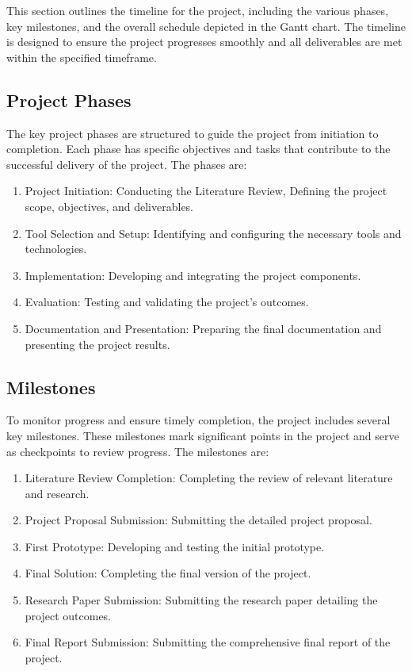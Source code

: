 This section outlines the timeline for the project, including the various phases, key milestones, and the overall schedule depicted in the Gantt chart. The timeline is designed to ensure the project progresses smoothly and all deliverables are met within the specified timeframe.

\vspace{12pt}
\subsection{Project Phases}
\vspace{12pt}

The key project phases are structured to guide the project from initiation to completion. Each phase has specific objectives and tasks that contribute to the successful delivery of the project. The phases are:
\begin{enumerate}
    \item Project Initiation: Conducting the Literature Review, Defining the project scope, objectives, and deliverables.
    \item Tool Selection and Setup: Identifying and configuring the necessary tools and technologies.
    \item Implementation: Developing and integrating the project components.
    \item Evaluation: Testing and validating the project's outcomes.
    \item Documentation and Presentation: Preparing the final documentation and presenting the project results.
\end{enumerate}

\vspace{12pt}
\subsection{Milestones}
\vspace{12pt}

To monitor progress and ensure timely completion, the project includes several key milestones. These milestones mark significant points in the project and serve as checkpoints to review progress. The milestones are:
\begin{enumerate}
    \item Literature Review Completion: Completing the review of relevant literature and research.
    \item Project Proposal Submission: Submitting the detailed project proposal.
    \item First Prototype: Developing and testing the initial prototype.
    \item Final Solution: Completing the final version of the project.
    \item Research Paper Submission: Submitting the research paper detailing the project outcomes.
    \item Final Report Submission: Submitting the comprehensive final report of the project.
\end{enumerate}

